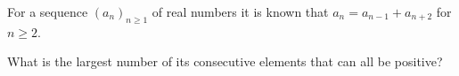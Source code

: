 For a sequence $(a_{n})_{n\geq 1}$ of real numbers it is known that $a_{n}=a_{n-1}+a_{n+2}$ for $n\geq 2$.

What is the largest number of its consecutive elements that can all be positive?